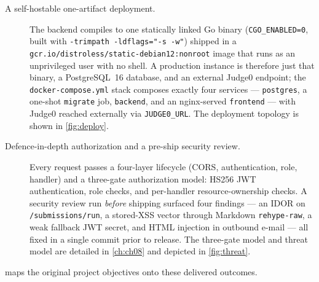 \begin{description}
  \item[A self-hostable one-artifact deployment.] The backend compiles to one
    statically linked Go binary (\texttt{CGO\_ENABLED=0}, built with
    \texttt{-trimpath -ldflags="-s -w"}) shipped in a
    \texttt{gcr.io/distroless/static-debian12:nonroot} image that runs as an
    unprivileged user with no shell. A production instance is therefore just
    that binary, a PostgreSQL~16 database, and an external Judge0 endpoint; the
    \texttt{docker-compose.yml} stack composes exactly four services ---
    \texttt{postgres}, a one-shot \texttt{migrate} job, \texttt{backend}, and
    an nginx-served \texttt{frontend} --- with Judge0 reached externally via
    \texttt{JUDGE0\_URL}. The deployment topology is shown in
    \cref{fig:deploy}.

  \item[Defence-in-depth authorization and a pre-ship security review.] Every
    request passes a four-layer lifecycle (CORS, authentication, role, handler)
    and a three-gate authorization model: HS256 JWT authentication, role
    checks, and per-handler resource-ownership checks. A security review run
    \emph{before} shipping surfaced four findings --- an IDOR on
    \texttt{/submissions/run}, a stored-XSS vector through Markdown
    \texttt{rehype-raw}, a weak fallback JWT secret, and HTML injection in
    outbound e-mail --- all fixed in a single commit prior to release. The
    three-gate model and threat model are detailed in \cref{ch:ch08} and
    depicted in \cref{fig:threat}.
\end{description}

 maps the original project objectives onto these delivered
outcomes.

